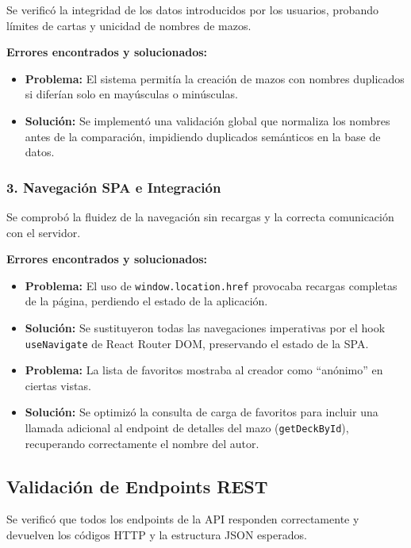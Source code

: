 Se verificó la integridad de los datos introducidos por los usuarios, probando límites de cartas y unicidad de nombres de mazos.

\textbf{Errores encontrados y solucionados:}

\begin{itemize}
    \item \textbf{Problema:} El sistema permitía la creación de mazos con nombres duplicados si diferían solo en mayúsculas o minúsculas.
    \item \textbf{Solución:} Se implementó una validación global que normaliza los nombres antes de la comparación, impidiendo duplicados semánticos en la base de datos.
\end{itemize}

\subsubsection{3. Navegación SPA e Integración}

Se comprobó la fluidez de la navegación sin recargas y la correcta comunicación con el servidor.

\textbf{Errores encontrados y solucionados:}

\begin{itemize}
    \item \textbf{Problema:} El uso de \texttt{window.location.href} provocaba recargas completas de la página, perdiendo el estado de la aplicación.
    \item \textbf{Solución:} Se sustituyeron todas las navegaciones imperativas por el hook \texttt{useNavigate} de React Router DOM, preservando el estado de la SPA.

    \item \textbf{Problema:} La lista de favoritos mostraba al creador como ``anónimo'' en ciertas vistas.
    \item \textbf{Solución:} Se optimizó la consulta de carga de favoritos para incluir una llamada adicional al endpoint de detalles del mazo (\texttt{getDeckById}), recuperando correctamente el nombre del autor.
\end{itemize}

\subsection{Validación de Endpoints REST}

Se verificó que todos los endpoints de la API responden correctamente y devuelven los códigos HTTP y la estructura JSON esperados.

